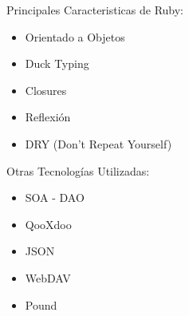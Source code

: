 \begin{frame}{Principales Caracteristicas de Ruby:\newline}

\begin{itemize}
	
	\item Orientado a Objetos
	\pause
	\item Duck Typing
	\pause
	\item Closures
	\pause
	\item Reflexión
	\pause
	\item DRY (Don't Repeat Yourself)
	
\end{itemize}

\end{frame}

\begin{frame}{Otras Tecnologías Utilizadas:\newline}
\begin{itemize}
	
	\item SOA - DAO
	\pause
	\item QooXdoo
	\pause
	\item JSON
	\pause
	\item WebDAV
	\pause
	\item Pound
	
\end{itemize}
\end{frame}
